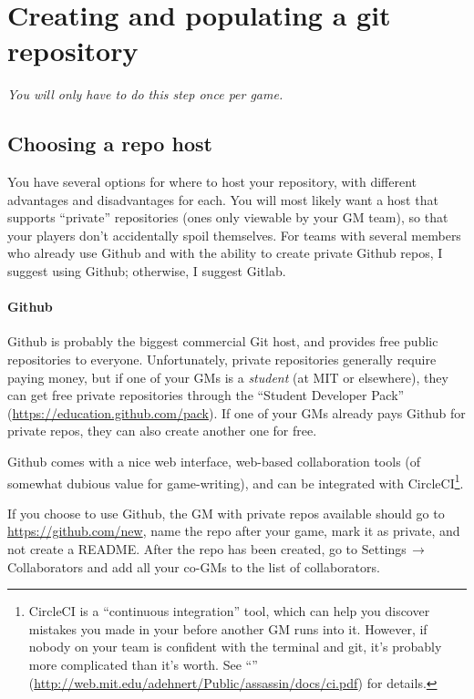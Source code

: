 \documentclass[green]{testgame}
\begin{document}
\section{Creating and populating a git repository}

{\em You will only have to do this step once per game.}

\subsection{Choosing a repo host}

You have several options for where to host your repository, with different advantages and disadvantages for each. You will most likely want a host that supports ``private'' repositories (ones only viewable by your GM team), so that your players don't accidentally spoil themselves. For teams with several members who already use Github and with the ability to create private Github repos, I suggest using Github; otherwise, I suggest Gitlab.

\paragraph*{Github} Github is probably the biggest commercial Git host, and provides free public repositories to everyone. Unfortunately, private repositories generally require paying money, but if one of your GMs is a \emph{student} (at MIT or elsewhere), they can get free private repositories through the ``Student Developer Pack'' (\url{https://education.github.com/pack}). If one of your GMs already pays Github for private repos, they can also create another one for free.

Github comes with a nice web interface, web-based collaboration tools (of somewhat dubious value for game-writing), and can be integrated with CircleCI\footnote{CircleCI is a ``continuous integration'' tool, which can help you discover mistakes you made in your \gametex{} before another GM runs into it. However, if nobody on your team is confident with the terminal and git, it's probably more complicated than it's worth. See ``\gCI{}'' (\url{http://web.mit.edu/adehnert/Public/assassin/docs/ci.pdf}) for details.}.

If you choose to use Github, the GM with private repos available should go to \url{https://github.com/new}, name the repo after your game, mark it as private, and not create a README. After the repo has been created, go to Settings$\,\to\,$Collaborators and add all your co-GMs to the list of collaborators.
\end{document}
